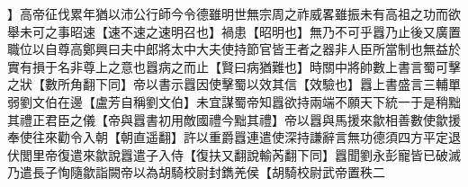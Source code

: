 】高帝征伐累年猶以沛公行師今令德雖明世無宗周之祚威畧雖振未有高祖之功而欲舉未可之事昭速【速不速之速明召也】禍患【昭明也】無乃不可乎囂乃止後又廣置職位以自尊高鄭興曰夫中郎將太中大夫使持節官皆王者之器非人臣所當制也無益於實有損于名非尊上之意也囂病之而止【賢曰病猶難也】時關中將帥數上書言蜀可擊之狀【數所角翻下同】帝以書示囂因使擊蜀以效其信【效驗也】囂上書盛言三輔單弱劉文伯在邊【盧芳自稱劉文伯】未宜謀蜀帝知囂欲持兩端不願天下統一于是稍黜其禮正君臣之儀【帝與囂書初用敵國禮今黜其禮】帝以囂與馬援來歙相善數使歙援奉使往來勸令入朝【朝直遥翻】許以重爵囂連遣使深持謙辭言無功德須四方平定退伏閭里帝復遣來歙說囂遣子入侍【復扶又翻說輸芮翻下同】囂聞劉永彭寵皆已破滅乃遣長子恂隨歙詣闕帝以為胡騎校尉封鐫羌侯【胡騎校尉武帝置秩二